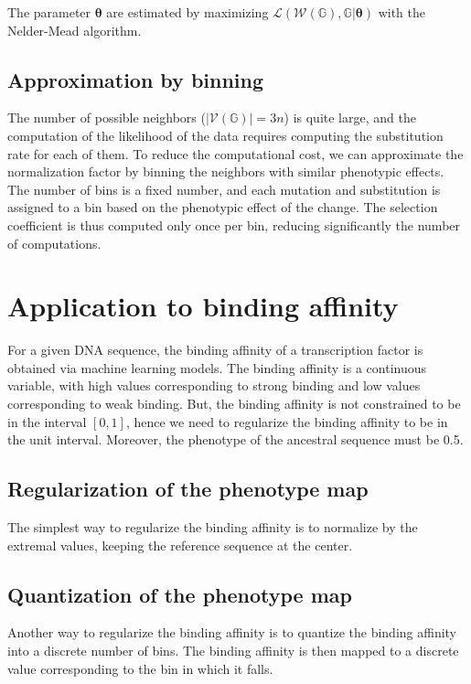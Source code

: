 \documentclass{article}
\newcommand{\NbrSites}{n}
\newcommand{\Geno}{\mathbb{G}}
\newcommand{\setNeighbors}{\mathcal{V}\left(\Geno\right)}
\newcommand{\Observed}{\mathcal{W}\left(\Geno\right)}
\newcommand{\FitParam}{\bm{\theta}}
\begin{document}
    The parameter $\FitParam$ are estimated by maximizing $\mathcal{L} (\Observed, \Geno | \FitParam )$ with the Nelder-Mead algorithm.

    \subsection{Approximation by binning}\label{subsec:approximation-by-binning}
    The number of possible neighbors ($\left| \setNeighbors \right| = 3 \NbrSites$) is quite large, and the computation of the likelihood of the data requires computing the substitution rate for each of them.
    To reduce the computational cost, we can approximate the normalization factor by binning the neighbors with similar phenotypic effects.
    The number of bins is a fixed number, and each mutation and substitution is assigned to a bin based on the phenotypic effect of the change.
    The selection coefficient is thus computed only once per bin, reducing significantly the number of computations.

    \section{Application to binding affinity}\label{sec:application-to-binding-affinity}

    For a given DNA sequence, the binding affinity of a transcription factor is obtained via machine learning models.
    The binding affinity is a continuous variable, with high values corresponding to strong binding and low values corresponding to weak binding.
    But, the binding affinity is not constrained to be in the interval $[0, 1]$, hence we need to regularize the binding affinity to be in the unit interval.
    Moreover, the phenotype of the ancestral sequence must be 0.5.

    \subsection{Regularization of the phenotype map}\label{subsec:regularization-of-the-phenotype-map}
    The simplest way to regularize the binding affinity is to normalize by the extremal values, keeping the reference sequence at the center.

    \subsection{Quantization of the phenotype map}\label{subsec:quantization-of-the-phenotype-map}
    Another way to regularize the binding affinity is to quantize the binding affinity into a discrete number of bins.
    The binding affinity is then mapped to a discrete value corresponding to the bin in which it falls.

    \printbibliography
\end{document}
